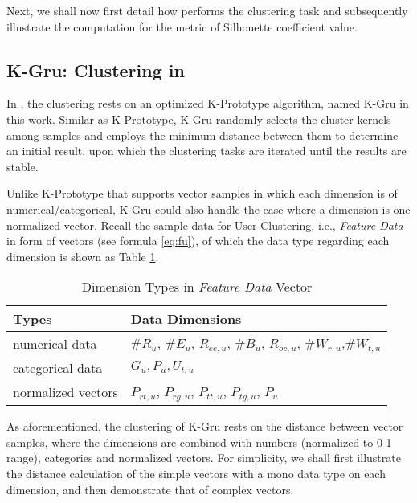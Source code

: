 Next, we shall now first detail how \sys{} performs the clustering task and subsequently illustrate the computation for the metric of Silhouette coefficient value.

\subsection{K-Gru: Clustering in \sys{}}
\label{sec:cluster}

In \sys{}, the clustering rests on an optimized K-Prototype \cite{IEEEexample:huang1997clustering} algorithm, named K-Gru in this work.
Similar as K-Prototype, K-Gru randomly selects the cluster kernels among samples and employs the minimum distance between them to determine an initial result, upon which the clustering tasks are iterated until the results are stable.

Unlike K-Prototype that supports vector samples in which each dimension is of numerical/categorical, K-Gru could also handle the case where a dimension is one normalized vector.
%
Recall the sample data for User Clustering, i.e., \textit{Feature Data} in form of vectors (see formula \ref{eq:fu}), of which the data type regarding each dimension is shown as Table \ref{tbl:data-type}.

\begin{table}[tb!]
\centering
\begin{small}
\caption{Dimension Types in \textit{Feature Data} Vector}
\vspace{0.1cm}
\label{tbl:data-type}
\begin{tabular}{ll}
\toprule
\multicolumn{1}{l}{\textbf{Types}} & \multicolumn{1}{l}{\textbf{Data Dimensions}}	\\	\midrule \midrule
numerical data				& $\#R_u$, $\#E_u$, $R_{ee,u}$, $\#B_u$, $R_{oc,u}$, $\#W_{r,u}$,$\#W_{t,u}$               \\	\midrule 				
categorical data			& $G_u, P_u, U_{t,u}$				\\	\midrule
normalized vectors			& $P_{rt,u}$, $P_{rg,u}$, $P_{tt,u}$, $P_{tg,u}$, $P_u$			\\ \bottomrule
\end{tabular}
\end{small}
\end{table}

As aforementioned, the clustering of K-Gru rests on the distance between vector samples, where the dimensions are combined with numbers (normalized to 0-1 range), categories and normalized vectors. For simplicity, we shall first illustrate the distance calculation of the simple vectors with a mono data type on each dimension, and then demonstrate that of complex vectors.

